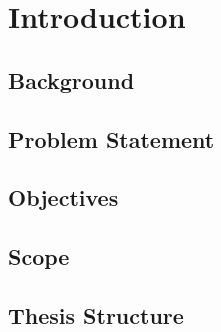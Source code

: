 \chapter{Introduction}
\label{chap:introduction}

\setcounter{section}{0}
\section{Background}
\label{sec:background}


\section{Problem Statement}
\label{sec:problem}


\section{Objectives}
\label{sec:objectives}


\section{Scope}
\label{sec:scope}


\section{Thesis Structure}
\label{sec:structure}





